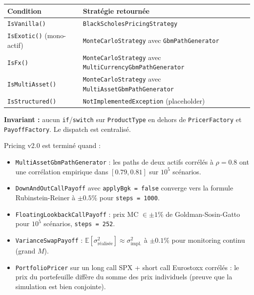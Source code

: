 \documentclass[a4paper,11pt]{article}
\newcommand{\cs}[1]{\texttt{\color{codeinline}#1}}
\begin{document}
\begin{center}
\begin{tabularx}{\textwidth}{l l}
\toprule
\textbf{Condition} & \textbf{Strat\'egie retourn\'ee} \\
\midrule
\cs{IsVanilla()} & \cs{BlackScholesPricingStrategy} \\
\cs{IsExotic()} (mono-actif) & \cs{MonteCarloStrategy} avec \cs{GbmPathGenerator} \\
\cs{IsFx()} & \cs{MonteCarloStrategy} avec \cs{MultiCurrencyGbmPathGenerator} \\
\cs{IsMultiAsset()} & \cs{MonteCarloStrategy} avec \cs{MultiAssetGbmPathGenerator} \\
\cs{IsStructured()} & \cs{NotImplementedException} (placeholder) \\
\bottomrule
\end{tabularx}
\end{center}

\textbf{Invariant :} aucun \cs{if}/\cs{switch} sur \cs{ProductType} en dehors de
\cs{PricerFactory} et \cs{PayoffFactory}. Le dispatch est centralis\'e.

\begin{tcolorbox}[deliverable]
Pricing v2.0 est termin\'e quand :
\begin{itemize}[leftmargin=1.5em]
  \item \cs{MultiAssetGbmPathGenerator} : les paths de deux actifs corr\'el\'es \`a $\rho=0.8$
        ont une corr\'elation empirique dans $[0.79, 0.81]$ sur $10^5$ sc\'enarios.
  \item \cs{DownAndOutCallPayoff} avec \cs{applyBgk = false} converge vers la formule
        Rubinstein-Reiner \`a $\pm 0.5\%$ pour \cs{steps = 1000}.
  \item \cs{FloatingLookbackCallPayoff} : prix MC $\in \pm 1\%$ de Goldman-Sosin-Gatto
        pour $10^5$ sc\'enarios, \cs{steps = 252}.
  \item \cs{VarianceSwapPayoff} : $\mathbb{E}[\sigma^2_\text{r\'ealis\'ee}] \approx \sigma^2_\text{impl.}$
        \`a $\pm 0.1\%$ pour monitoring continu (grand $M$).
  \item \cs{PortfolioPricer} sur un long call SPX + short call Eurostoxx corr\'el\'es :
        le prix du portefeuille diff\`ere du somme des prix individuels (preuve que la
        simulation est bien conjointe).
\end{itemize}
\end{tcolorbox}

\newpage
\end{document}
